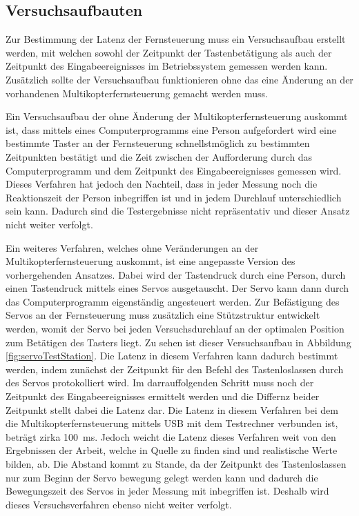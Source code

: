 \subsection{Versuchsaufbauten}
Zur Bestimmung der Latenz der Fernsteuerung muss ein Versuchsaufbau erstellt werden, mit welchen sowohl der Zeitpunkt der Tastenbetätigung als auch der Zeitpunkt des Eingabeereignisses im Betriebssystem gemessen werden kann. Zusätzlich sollte der Versuchsaufbau funktionieren ohne das eine Änderung an der vorhandenen Multikopterfernsteuerung gemacht werden muss.

Ein Versuchsaufbau der ohne Änderung der Multikopterfernsteuerung auskommt ist, dass mittels eines Computerprogramms eine Person aufgefordert wird eine bestimmte Taster an der Fernsteuerung schnellstmöglich zu bestimmten Zeitpunkten bestätigt und die Zeit zwischen der Aufforderung durch das Computerprogramm und dem Zeitpunkt des Eingabeereignisses gemessen wird. Dieses Verfahren hat jedoch den Nachteil, dass in jeder Messung noch die Reaktionszeit der Person inbegriffen ist und in jedem Durchlauf unterschiedlich sein kann. Dadurch sind die Testergebnisse nicht repräsentativ und dieser Ansatz nicht weiter verfolgt.

Ein weiteres Verfahren, welches ohne Veränderungen an der Multikopterfernsteuerung auskommt, ist eine angepasste Version des vorhergehenden Ansatzes. Dabei wird der Tastendruck durch eine Person, durch einen Tastendruck mittels eines Servos ausgetauscht. Der Servo kann dann durch das Computerprogramm eigenständig angesteuert werden. Zur Befästigung des Servos an der Fernsteuerung muss zusätzlich eine Stützstruktur entwickelt werden, womit der Servo bei jeden Versuchsdurchlauf an der optimalen Position zum Betätigen des Tasters liegt. Zu sehen ist dieser Versuchsaufbau in Abbildung \ref{fig:servoTestStation}. Die Latenz in diesem Verfahren kann dadurch bestimmt werden, indem zunächst der Zeitpunkt für den Befehl des Tastenloslassen durch des Servos protokolliert wird. Im darrauffolgenden Schritt muss noch der Zeitpunkt des Eingabeereignisses ermittelt werden und die Differnz beider Zeitpunkt stellt dabei die Latenz dar. Die Latenz in diesem Verfahren bei dem die Multikopterfernsteuerung mittels USB mit dem Testrechner verbunden ist, beträgt zirka 100~ms. Jedoch weicht die Latenz dieses Verfahren weit von den Ergebnissen der Arbeit, welche in Quelle \cite{wimmerLatenzStation} zu finden sind und realistische Werte bilden, ab. Die Abstand kommt zu Stande, da der Zeitpunkt des Tastenloslassen nur zum Beginn der Servo bewegung gelegt werden kann und dadurch die Bewegungszeit des Servos in jeder Messung mit inbegriffen ist. Deshalb wird dieses Versuchsverfahren ebenso nicht weiter verfolgt.


